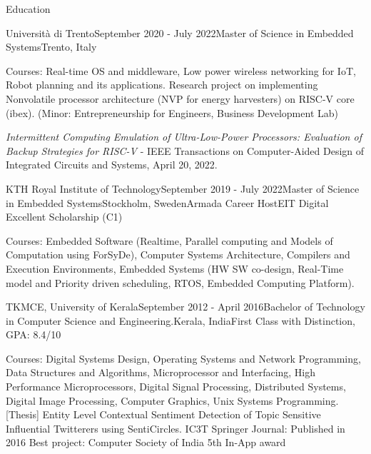 \documentclass[
	a4paper, %
	11pt, %
]{resume} %
\begin{document}

\begin{rSection}{Education}
    \begin{rSubsection}{Università di Trento}{September 2020 - July 2022}{Master of Science in Embedded Systems}{Trento, Italy}

        Courses: Real-time OS and middleware, Low power wireless networking for IoT, Robot planning and its applications. Research project on implementing Nonvolatile processor architecture (NVP for energy harvesters) on RISC-V core (ibex). (Minor: Entrepreneurship for Engineers, Business Development Lab)
    
        {\color{orange}\emph{Intermittent Computing Emulation of Ultra-Low-Power Processors: Evaluation of Backup Strategies for RISC-V} - IEEE Transactions on Computer-Aided Design of Integrated Circuits and Systems, April 20, 2022}.
    \end{rSubsection}

    \begin{rSubsection6}{KTH Royal Institute of Technology}{September 2019 - July 2022}{Master of Science in Embedded Systems}{Stockholm, Sweden}{Armada Career Host}{EIT Digital Excellent Scholarship (C1)}

        Courses: Embedded Software (Realtime, Parallel computing and Models of Computation using ForSyDe), Computer Systems Architecture, Compilers and Execution Environments, Embedded Systems (HW SW co-design, Real-Time model and Priority driven scheduling, RTOS, Embedded Computing Platform).
    \end{rSubsection6}
    
    \begin{rSubsection5}{TKMCE, University of Kerala}{September 2012 - April 2016}{Bachelor of Technology in Computer Science and Engineering.}{Kerala, India}{First Class with Distinction, GPA: 8.4/10}

        Courses: Digital Systems Design, Operating Systems and Network Programming, Data Structures and Algorithms, Microprocessor and Interfacing, High Performance Microprocessors, Digital Signal Processing, Distributed Systems, Digital Image Processing, Computer Graphics, Unix Systems Programming.\hfill
        \bigskip\break
        {\color{orange}[Thesis] Entity Level Contextual Sentiment Detection of Topic Sensitive Influential Twitterers using SentiCircles. \break
        IC3T Springer Journal: Published in 2016 \hfill \break
        Best project: Computer Society of India 5th In-App award} \hfill

    
    \end{rSubsection5}
    
		
\end{rSection}
\end{document}
